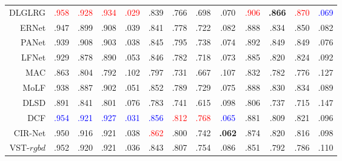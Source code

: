 \begin{table}[]
{\begin{tabular}{rcccccccccccc}
			DLGLRG \cite{liu2021light} 
			& {\textcolor{red}{.958}} & {\textcolor{red}{.928}} 			& {\textcolor{red}{.934}} & {\textcolor{red}{.029}} 
			&	.839 &	.766 &	.698 &	.070 
			&	{\textcolor{red}{.906}} &	\textbf{ {.866}} 			&	{\textcolor{red}{.870}} &	\textcolor{blue}{.069} 
			\\
			
			ERNet \cite{piao2020exploit}
			& .947 & .899 & .908 & .039 
			&	.841 &	.778 &	.722 &	.082 
			&	.888 &	.834 &	.850 &	.082 
			\\
			
			PANet \cite{piao2021panet} 
			& .939 & .908 & .903 & .038 
			& .845 & .795 & .738 & .074 
			& .892 & .849 & .849 & .076
			\\
			
			LFNet	 \cite{zhang2020lfnet} 
			& .929 & .878 & .890 & .053
			&	.846 &	.782 &	.718 &	.073 
			&	.885 &	.820 &	.824 &	.092 \\
			
			MAC	 \cite{zhang2020light} 
			& .863	& .804	& .792	& .102	
			&   .797 & .731 & .667 & .107 
			& .832 & .782 & .776 & .127 \\
			
			MoLF	 \cite{zhang2019memory} 
			& .938 & .887 & .902 & .051 
			&	.852 &	.789 &	.729 &	.075 
			&	.888 &	.830 &	.834 &	.089 \\
			
			DLSD	\cite{piao2019deep}
			& .891	& .841	& .801	& .076	
			&   .783 & .741 & .615 & .098 
			& .806 & .737 & .715 & .147 \\
			
			\midrule %
			
			
			DCF \cite{ji2021calibrated} 
			& \textcolor{blue}{.954} & \textcolor{blue}{.921} & \textcolor{blue}{.927} & \textcolor{blue}{.031} 
			& \textcolor{blue}{.856} & {\textcolor{red}{.812}} & {\textcolor{red}{.768}} & \textcolor{blue}{.065} 
			& .881 & .809 & .821 & .096 \\
			
			CIR-Net \cite{cong2022cir}
			& .950 & .916 & .921 & .038 
			& {\textcolor{red}{.862}} & .800  			& .742 & \textbf{ {.062}} 
			& .874 & .820 & .816 & .098 \\ 
			
			VST-$rgbd$  \cite{liu2021visual} 
			& .952 & .920 & .921 & .036 
			& .843 & .807 & .754 & .086 
			& .851 & .792 & .786 & .110 
			\\
			

\end{tabular}}
\end{table}

